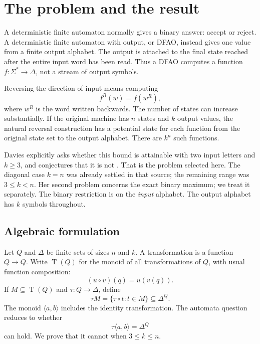 \documentclass[11pt,a4paper]{article}
\numberwithin{equation}{section}
\theoremstyle{definition}
\theoremstyle{remark}
\newcommand{\D}{\Delta}
\newcommand{\TQ}{\operatorname{T}(Q)}
\begin{document}
\section{The problem and the result}\label{sec:introduction}

A deterministic finite automaton normally gives a binary answer: accept or
reject. A deterministic finite automaton with output, or DFAO, instead gives
one value from a finite output alphabet. The output is attached to the final
state reached after the entire input word has been read. Thus a DFAO computes
a function $f:\Sigma^*\to\D$, not a stream of output symbols.

Reversing the direction of input means computing
\[
 f^R(w)=f(w^R),
\]
where $w^R$ is the word written backwards. The number of states can increase
substantially. If the original machine has $n$ states and $k$ output values,
the natural reversal construction has a potential state for each function
from the original state set to the output alphabet. There are $k^n$ such
functions.

Davies explicitly asks whether this bound is attainable with two input
letters and $k\ge3$, and conjectures that it is not
\cite[Section~5, Problem~1, printed page~17]{Davies2017}. That is the
problem selected here. The diagonal case $k=n$ was already settled in that
source; the remaining range was $3\le k<n$. Her second problem concerns the
exact binary maximum; we treat it separately. The binary restriction is on the \emph{input}
alphabet. The output alphabet has $k$ symbols throughout.

\subsection{Algebraic formulation}

Let $Q$ and $\D$ be finite sets of sizes $n$ and $k$. A transformation is a
function $Q\to Q$. Write $\TQ$ for the monoid of all transformations of $Q$,
with usual function composition:
\[
 (u\circ v)(q)=u(v(q)).
\]
If $M\subseteq\TQ$ and $\tau:Q\to\D$, define
\[
 \tau M=\{\tau\circ t:t\in M\}\subseteq\D^Q.
\]
The monoid $\langle a,b\rangle$ includes the identity transformation.
The automata question reduces to whether
\begin{equation}\label{eq:fullorbit}
 \tau\langle a,b\rangle=\D^Q
\end{equation}
can hold. We prove that it cannot when $3\le k\le n$.
\end{document}
